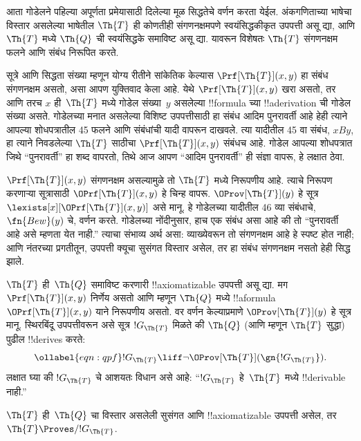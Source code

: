 \documentclass[../../../include/open-logic-section]{subfiles}
\begin{document}


आता गोडेलने पहिल्या अपूर्णता प्रमेयासाठी दिलेल्या मूळ
सिद्धतेचे वर्णन करता येईल. अंकगणिताच्या भाषेचा विस्तार
असलेल्या भाषेतील $\Th{T}$ ही कोणतीही संगणनक्षमपणे
स्वयंसिद्धकीकृत उपपत्ती असू द्या, आणि $\Th{T}$ मध्ये
$\Th{Q}$ ची स्वयंसिद्धके समाविष्ट असू द्या. यावरून
विशेषतः $\Th{T}$ संगणनक्षम फलने आणि संबंध
निरूपित करते.

सूत्रे आणि सिद्धता संख्या म्हणून योग्य रीतीने सांकेतिक
केल्यास $\Prf[\Th{T}](x,y)$ हा संबंध संगणनक्षम
असतो, असा आपण युक्तिवाद केला आहे. येथे
$\Prf[\Th{T}](x,y)$ खरा असतो, तर आणि तरच
$x$ ही~$\Th{T}$ मध्ये गोडेल संख्या~$y$
असलेल्या !!{formula} च्या !!a{derivation}
ची गोडेल संख्या असते. गोडेलच्या मनात असलेल्या
विशिष्ट उपपत्तीसाठी हा संबंध आदिम पुनरावर्ती आहे
हेही त्याने आपल्या शोधपत्रातील 45 फलने आणि
संबंधांची यादी वापरून दाखवले. त्या यादीतील
45 वा संबंध, $x B y$, हा त्याने निवडलेल्या
$\Th{T}$ साठीचा $\Prf[\Th{T}](x,y)$
संबंधच आहे. गोडेल आपल्या शोधपत्रात जिथे
“पुनरावर्ती” हा शब्द वापरतो, तिथे आज आपण
“आदिम पुनरावर्ती” ही संज्ञा वापरू, हे लक्षात ठेवा.

$\Prf[\Th{T}](x,y)$ संगणनक्षम असल्यामुळे
तो $\Th{T}$ मध्ये निरूपणीय आहे. त्याचे
निरूपण करणाऱ्या सूत्रासाठी
$\OPrf[\Th{T}](x,y)$ हे चिन्ह वापरू.
$\OProv[\Th{T}](y)$ हे सूत्र
$\lexists[x][\OPrf[\Th{T}](x,y)]$
असे मानू. हे गोडेलच्या यादीतील 46 व्या
संबंधाचे, $ \fn{Bew}(y)$ चे, वर्णन करते.
गोडेलच्या नोंदीनुसार, हाच एक संबंध असा
आहे की तो “पुनरावर्ती आहे असे म्हणता येत
नाही.” त्याचा संभाव्य अर्थ असा: व्याख्येवरून
तो संगणनक्षम आहे हे स्पष्ट होत नाही; आणि
नंतरच्या प्रगतीतून, उपपत्ती क्यूचा सुसंगत विस्तार असेल,
तर हा संबंध संगणनक्षम नसतो हेही सिद्ध झाले.

$\Th{T}$ ही~$\Th{Q}$ समाविष्ट करणारी
!!{axiomatizable} उपपत्ती असू द्या. मग
$\Prf[\Th{T}](x, y)$ निर्णेय असतो आणि
म्हणून $\Th{Q}$ मध्ये
!!a{formula}~$\OPrf[\Th{T}](x, y)$
याने निरूपणीय असतो. वर वर्णन केल्याप्रमाणे
$\OProv[\Th{T}](y)$ हे सूत्र मानू.
स्थिरबिंदू उपपत्तीवरून असे सूत्र
$!G_\Th{T}$ मिळते की $\Th{Q}$
(आणि म्हणून $\Th{T}$ सुद्धा) पुढील
!!{derive}s करते:
\begin{equation}
\ollabel{eqn:qpf}
!G_\Th{T} \liff \lnot \OProv[\Th{T}](\gn{!G_\Th{T}}).
\end{equation}
लक्षात घ्या की $!G_\Th{T}$ चे
आशयतः विधान असे आहे: “$!G_\Th{T}$
हे~$\Th{T}$ मध्ये !!{derivable} नाही.”

\begin{lem}
$\Th{T}$ ही~$\Th{Q}$ चा विस्तार असलेली
सुसंगत आणि !!{axiomatizable} उपपत्ती
असेल, तर $\Th{T} \Proves/ !G_\Th{T}$.
\end{lem}
\end{document}
